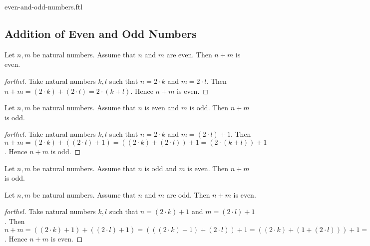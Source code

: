 \documentclass{naproche-library}
\begin{document}
\begin{smodule}{even-and-odd-numbers.ftl}
  \subsection*{Addition of Even and Odd Numbers}

  \begin{proposition}[forthel,id=ARITHMETIC_15_7845441256365256,printid]
    Let $n, m$ be natural numbers.
    Assume that $n$ and $m$ are even.
    Then $n + m$ is even.
  \end{proposition}
  \begin{proof}[forthel]
    Take natural numbers $k, l$ such that $n = 2 \cdot k$ and $m = 2 \cdot l$.
    Then $n + m
      = (2 \cdot k) + (2 \cdot l)
      = 2 \cdot (k + l)$.
    Hence $n + m$ is even.
  \end{proof}

  \begin{proposition}[forthel,id=ARITHMETIC_15_1023655256985478,printid]
    Let $n, m$ be natural numbers.
    Assume that $n$ is even and $m$ is odd.
    Then $n + m$ is odd.
  \end{proposition}
  \begin{proof}[forthel]
    Take natural numbers $k, l$ such that $n = 2 \cdot k$ and $m = (2 \cdot l) + 1$.
    Then $n + m
      = (2 \cdot k) + ((2 \cdot l) + 1)
      = ((2 \cdot k) + (2 \cdot l)) + 1
      = (2 \cdot (k + l)) + 1$.
    Hence $n + m$ is odd.
  \end{proof}

  \begin{corollary}[forthel,id=ARITHMETIC_15_0125412589658745,printid]
    Let $n, m$ be natural numbers.
    Assume that $n$ is odd and $m$ is even.
    Then $n + m$ is odd.
  \end{corollary}

  \begin{proposition}[forthel,id=ARITHMETIC_15_1023659854785412,printid]
    Let $n, m$ be natural numbers.
    Assume that $n$ and $m$ are odd.
    Then $n + m$ is even.
  \end{proposition}
  \begin{proof}[forthel]
    Take natural numbers $k, l$ such that $n = (2 \cdot k) + 1$ and $m = (2 \cdot l) + 1$.
    Then $n + m
      = ((2 \cdot k) + 1) + ((2 \cdot l) + 1)
      = (((2 \cdot k) + 1) + (2 \cdot l)) + 1
      = ((2 \cdot k) + (1 + (2 \cdot l))) + 1
      = ((2 \cdot k) + ((2 \cdot l) + 1)) + 1
      = (((2 \cdot k) + (2 \cdot l)) + 1) + 1
      = ((2 \cdot k) + (2 \cdot l)) + (1 + 1)
      = ((2 \cdot k) + (2 \cdot l)) + 2
      = (2 \cdot (k + l)) + 2
      = 2 \cdot ((k + l) + 1)$.
      Hence $n + m$ is even.
  \end{proof}



\end{smodule}
\end{document}

